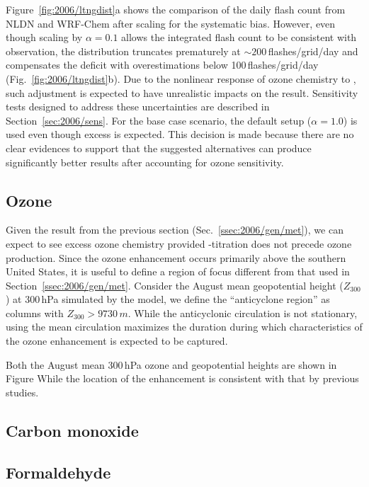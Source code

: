 Figure~\ref{fig:2006/ltngdist}a shows the comparison of the daily flash count from NLDN and WRF-Chem after scaling for the
systematic bias. However, even though scaling by $\alpha=0.1$ allows the integrated flash count to be consistent with observation,
the distribution truncates prematurely at $\sim200$\,\unit{flashes/grid/day} and compensates the deficit with overestimations
below 100\,\unit{flashes/grid/day} (Fig.~\ref{fig:2006/ltngdist}b). Due to the nonlinear response of ozone chemistry to {\lnox}, such adjustment is
expected to have unrealistic impacts on the result. Sensitivity tests designed to address these uncertainties are described in
Section~\ref{sec:2006/sens}. For the base case scenario, the default setup ($\alpha=1.0$) is used even though excess {\lnox}
is expected. This decision is made because there are no clear evidences to support that the suggested alternatives can
produce significantly better results after accounting for ozone sensitivity.

\subsection{Ozone}\label{ssec:2006/gen/ozone}

Given the result from the previous section (Sec.~\ref{ssec:2006/gen/met}), we can expect to see excess ozone chemistry provided
-titration does not precede ozone production. Since the ozone enhancement occurs primarily above the southern
United States, it is useful to define a region of focus different from that used in Section~\ref{ssec:2006/gen/met}. Consider the
August mean geopotential height ($Z_{300}$) at 300\,\unit{hPa} simulated by the model, we define the ``anticyclone region'' as
columns with $Z_{300}>9730\,\unit{m}$. While the anticyclonic circulation is not stationary, using the mean circulation maximizes
the duration during which characteristics of the ozone enhancement is expected to be captured.

Both the August mean 300\,\unit{hPa} ozone and geopotential heights are shown in Figure %
While the location of the enhancement is consistent with that by previous studies.

\subsection{Carbon monoxide}\label{ssec:2006/gen/co}
\subsection{Formaldehyde}\label{ssec:2006/gen/form}
